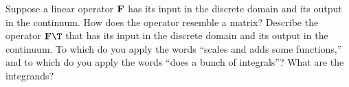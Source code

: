\begin{exer}
\item
Suppose a linear operator $\bold F$ has
its input in the discrete domain and
its output in the continuum.
How does the operator resemble a matrix?
Describe the operator $\bold F\T$ that has
its input in the discrete domain and
its output in the continuum.
To which do you apply the words
``scales and adds some functions,''
and to which do you apply the words
``does a bunch of integrals''?
What are the integrands?

%
%
%


\end{exer}
